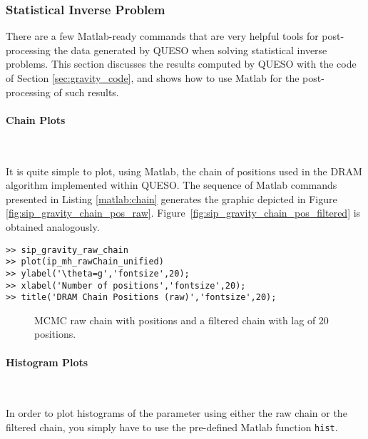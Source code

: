 \subsubsection{Statistical Inverse Problem}

There are a few Matlab-ready commands that are very helpful tools for post-processing the data 
generated by QUESO when solving statistical inverse problems.
This section discusses the results computed by QUESO with the code of Section 
\ref{sec:gravity_code}, and shows how to use Matlab for the post-processing of such results.

\paragraph{Chain Plots}\

It is quite simple to plot, using Matlab, the chain of positions used in the DRAM algorithm 
implemented within QUESO. 
The sequence of Matlab commands presented in Listing \ref{matlab:chain} generates the 
graphic depicted in Figure \ref{fig:sip_gravity_chain_pos_raw}.
Figure~\ref{fig:sip_gravity_chain_pos_filtered} is obtained analogously. 

\begin{lstlisting}[label=matlab:chain,caption={Matlab code for the chain plot.}]
% inside Matlab
>> sip_gravity_raw_chain
>> plot(ip_mh_rawChain_unified)
>> ylabel('\theta=g','fontsize',20);
>> xlabel('Number of positions','fontsize',20);
>> title('DRAM Chain Positions (raw)','fontsize',20);
\end{lstlisting}

\begin{figure}[p]
\centering 
{}
\vspace*{-10pt}
\caption{MCMC raw chain with \chainsizeresults{} positions and a filtered chain with lag of 20 positions.}
\end{figure}

\paragraph{Histogram Plots}\

In order to plot histograms of the parameter using either the raw chain or the filtered chain, 
you simply have to use the pre-defined Matlab function \verb+hist+.

